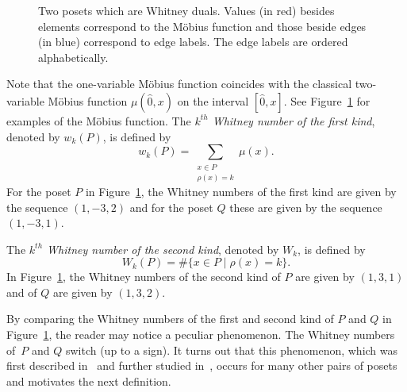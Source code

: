 \begin{figure}
    \caption{Two posets which are Whitney duals.  Values (in red) besides elements correspond to the M\"obius function and those beside edges (in blue) correspond to edge labels.  The edge labels are ordered alphabetically.}\label{fig:WhitneyDualExample}
\end{figure}

Note that the one-variable M\"obius function coincides with the classical two-variable M\"obius function $\mu(\hat{0},x)$ on the interval $[\hat{0},x]$. See Figure~\ref{fig:WhitneyDualExample}  for examples of the M\"obius function.    The \emph{$k^{th}$ Whitney number of the first kind}, denoted by $w_k(P)$,  is defined by
$$
w_k(P) = \sum_{\substack{x\in P\\ \rho(x) = k}} \mu(x).
$$
For the poset  $P$ in Figure~\ref{fig:WhitneyDualExample}, the Whitney numbers of the first kind are given by the sequence $(1, -3 ,2)$ and for the poset $Q$ these are given by the sequence $(1,-3,1)$.  

 The \emph{$k^{th}$ Whitney number of the second kind}, denoted by $W_k$, is defined by 
 $$
 W_k(P) =  \#\{x\in P \mid \rho(x)=k\}.
 $$
In Figure~\ref{fig:WhitneyDualExample}, the Whitney numbers of the second  kind of $P$ are given by $(1, 3, 1)$ and of $Q$ are given by $(1, 3 , 2)$.  

By comparing the Whitney numbers of the first and second kind of $P$ and $Q$ in Figure~\ref{fig:WhitneyDualExample}, the reader may notice a peculiar phenomenon. The Whitney numbers of~$P$ and $Q$  switch (up to a sign).  It turns out that this phenomenon, which was first described in~\cite{GonzalezHallam2017} and further studied in~\cite{GonzalezHallam2021}, occurs for many other pairs of posets and motivates the next definition.

